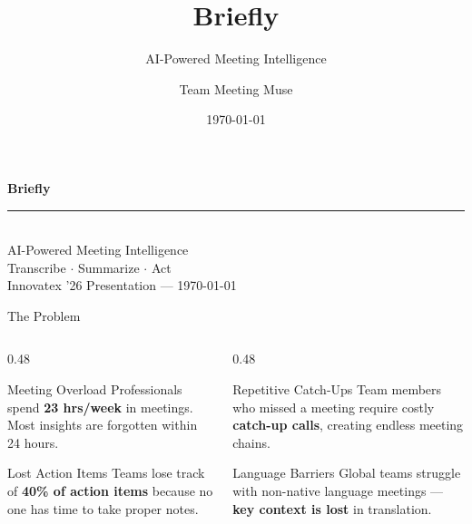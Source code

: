 \documentclass[aspectratio=169]{beamer}
\title{\textbf{Briefly}}
\subtitle{AI-Powered Meeting Intelligence}
\author{Team Meeting Muse}
\date{\today}
\newcommand{\hl}[1]{\textcolor{accentlight}{\textbf{#1}}}
\begin{document}
\begin{frame}[plain]

  \vspace{1.5cm}
  \begin{center}
    {\fontsize{52}{60}\selectfont \textcolor{accentlight}{\textbf{Briefly}}}\\[0.4cm]
    \textcolor{accent}{\rule{9cm}{0.8pt}}\\[0.4cm]
    {\large \textcolor{textgray}{AI-Powered Meeting Intelligence}}\\[0.3cm]
    {\normalsize \textcolor{textgray}{Transcribe $\cdot$ Summarize $\cdot$ Act}}\\[0.8cm]
    {\small \textcolor{textgray}{Innovatex '26 Presentation --- \today}}
  \end{center}
\end{frame}

\begin{frame}{The Problem}
  \begin{columns}[T]
    \begin{column}{0.48\textwidth}
      \begin{block}{Meeting Overload}
        Professionals spend \hl{23 hrs/week} in meetings. Most insights are forgotten within 24 hours.
      \end{block}
      \vspace{0.3cm}
      \begin{block}{Lost Action Items}
        Teams lose track of \hl{40\% of action items} because no one has time to take proper notes.
      \end{block}
    \end{column}
    \begin{column}{0.48\textwidth}
      \begin{block}{Repetitive Catch-Ups}
        Team members who missed a meeting require costly \hl{catch-up calls}, creating endless meeting chains.
      \end{block}
      \vspace{0.3cm}
      \begin{block}{Language Barriers}
        Global teams struggle with non-native language meetings --- \hl{key context is lost} in translation.
      \end{block}
    \end{column}
  \end{columns}
\end{frame}
\end{document}
